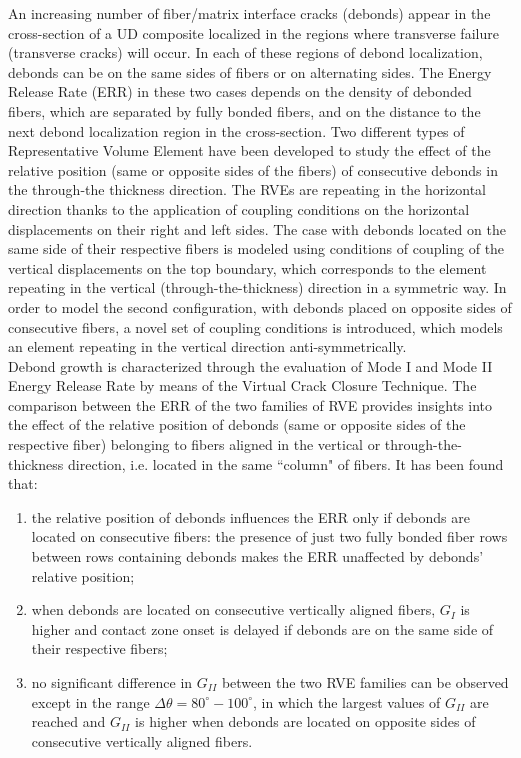 An increasing number of fiber/matrix interface cracks (debonds) appear in the cross-section of a UD composite localized in the regions where transverse failure (transverse cracks) will occur. In each of these regions of debond localization, debonds can be on the same sides of fibers or on alternating sides. The Energy Release Rate (ERR) in these two cases depends on the density of debonded fibers, which are separated by fully bonded fibers, and on the distance to the next debond localization region in the cross-section. Two different types of Representative Volume Element have been developed to study the effect of the relative position (same or opposite sides of the fibers) of consecutive debonds in the through-the thickness direction. The RVEs are repeating in the horizontal direction thanks to the application of coupling conditions on the horizontal displacements on their right and left sides. The case with debonds located on the same side of their respective fibers is modeled using conditions of coupling of the vertical displacements on the top boundary, which corresponds to the element repeating in the vertical (through-the-thickness) direction in a symmetric way. In order to model the second configuration, with debonds placed on opposite sides of consecutive fibers, a novel set of coupling conditions is introduced, which models an element repeating in the vertical direction anti-symmetrically.\\
Debond growth is characterized through the evaluation of Mode I and Mode II Energy Release Rate by means of the Virtual Crack Closure Technique. The comparison between the ERR of the two families of RVE provides insights into the effect of the relative position of debonds (same or opposite sides of the respective fiber) belonging to fibers aligned in the vertical or through-the-thickness direction, i.e. located in the same ``column" of fibers. It has been found that:

\begin{enumerate}
\item the relative position of debonds influences the ERR only if debonds are located on consecutive fibers: the presence of just two fully bonded fiber rows between rows containing debonds makes the ERR unaffected by debonds' relative position;
\item when debonds are located on consecutive vertically aligned fibers, $G_{I}$  is higher and contact zone onset is delayed if debonds are on the same side of their respective fibers;
\item no significant difference in $G_{II}$ between the two RVE families can be observed except in the range $\Delta\theta=80^{\circ}-100^{\circ}$, in which the largest values of $G_{II}$ are reached and $G_{II}$ is higher when debonds are located on opposite sides of consecutive vertically aligned fibers.
\end{enumerate}

